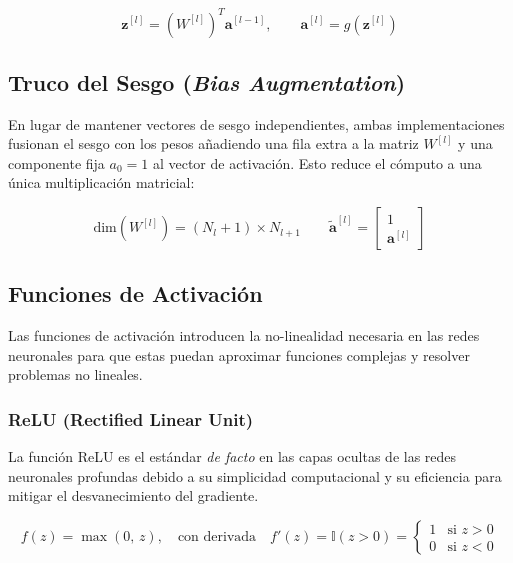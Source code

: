 \begin{equation}
    \mathbf{z}^{[l]} = \left(W^{[l]}\right)^T \mathbf{a}^{[l-1]},
    \qquad
    \mathbf{a}^{[l]} = g\!\left(\mathbf{z}^{[l]}\right)
\end{equation}

\subsection{Truco del Sesgo (\textit{Bias Augmentation})}

En lugar de mantener vectores de sesgo independientes, ambas implementaciones fusionan el
sesgo con los pesos añadiendo una fila extra a la matriz $W^{[l]}$ y una componente fija
$a_0 = 1$ al vector de activación. Esto reduce el cómputo a una única multiplicación
matricial:

\begin{equation}
    \text{dim}(W^{[l]}) = (N_l + 1) \times N_{l+1}
    \qquad \tilde{\mathbf{a}}^{[l]} = \begin{bmatrix}1 \\ \mathbf{a}^{[l]}\end{bmatrix}
\end{equation}

\subsection{Funciones de Activación}

Las funciones de activación introducen la no-linealidad necesaria en las redes neuronales para que estas puedan aproximar funciones complejas y resolver problemas no lineales.

\subsubsection{ReLU (Rectified Linear Unit)}

La función ReLU es el estándar \textit{de facto} en las capas ocultas de las redes neuronales profundas debido a su simplicidad computacional y su eficiencia para mitigar el desvanecimiento del gradiente.

\begin{equation}
    f(z) = \max(0,\,z), \quad \text{con derivada} \quad f'(z) = \mathbb{I}(z>0) = \begin{cases} 1 & \text{si } z > 0 \\ 0 & \text{si } z < 0 \end{cases}
\end{equation}

